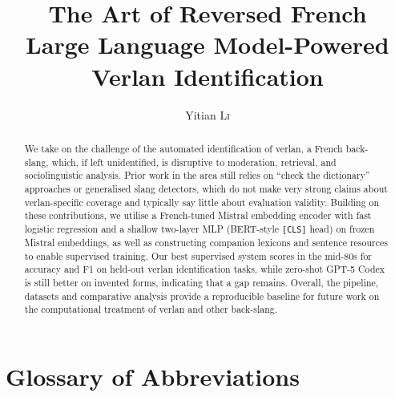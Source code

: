 \documentclass[12pt]{article}
\title{The Art of Reversed French\\\large Large Language Model-Powered Verlan Identification}
\author{Yitian \textsc{Li}}
\newcommand{\blankpage}{%
  \clearpage
  \thispagestyle{empty}
  \null
  \clearpage}
\newif\ifskipsectionclear
\begin{document}
\maketitle

\blankpage

\begin{abstract}
We take on the challenge of the automated identification of verlan, a French back-slang, which, if left unidentified, is disruptive to moderation, retrieval, and sociolinguistic analysis. Prior work in the area still relies on ``check the dictionary'' approaches or generalised slang detectors, which do not make very strong claims about verlan-specific coverage and typically say little about evaluation validity. Building on these contributions, we utilise a French-tuned Mistral embedding encoder with fast logistic regression and a shallow two-layer MLP (BERT-style \texttt{[CLS]} head) on frozen Mistral embeddings, as well as constructing companion lexicons and sentence resources to enable supervised training. Our best supervised system scores in the mid-80s for accuracy and F1 on held-out verlan identification tasks, while zero-shot GPT-5 Codex is still better on invented forms, indicating that a gap remains. Overall, the pipeline, datasets and comparative analysis provide a reproducible baseline for future work on the computational treatment of verlan and other back-slang.
\end{abstract}

\blankpage
\tableofcontents
\thispagestyle{empty}

\cleardoublepage
\skipsectioncleartrue
{}
\setcounter{page}{1}
\section*{Glossary of Abbreviations}
\end{document}

